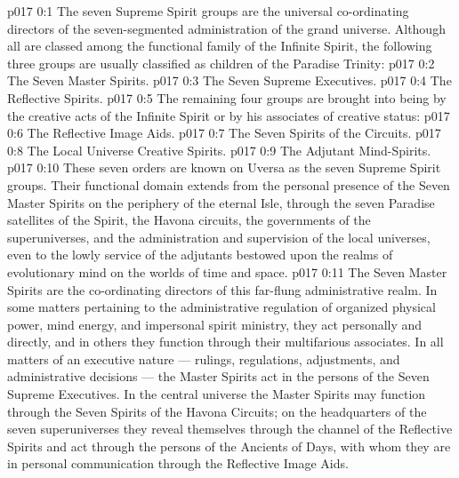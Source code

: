 \author{Divine Counsellor}
\vs p017 0:1 The seven Supreme Spirit groups are the universal co\hyp{}ordinating directors of the seven\hyp{}segmented administration of the grand universe. Although all are classed among the functional family of the Infinite Spirit, the following three groups are usually classified as children of the Paradise Trinity:
\vs p017 0:2 \bibnobreakspace The Seven Master Spirits.
\vs p017 0:3 \bibnobreakspace The Seven Supreme Executives.
\vs p017 0:4 \bibnobreakspace The Reflective Spirits.
\vs p017 0:5 \pc The remaining four groups are brought into being by the creative acts of the Infinite Spirit or by his associates of creative status:
\vs p017 0:6 \bibnobreakspace The Reflective Image Aids.
\vs p017 0:7 \bibnobreakspace The Seven Spirits of the Circuits.
\vs p017 0:8 \bibnobreakspace The Local Universe Creative Spirits.
\vs p017 0:9 \bibnobreakspace The Adjutant Mind\hyp{}Spirits.
\vs p017 0:10 \pc These seven orders are known on Uversa as the seven Supreme Spirit groups. Their functional domain extends from the personal presence of the Seven Master Spirits on the periphery of the eternal Isle, through the seven Paradise satellites of the Spirit, the Havona circuits, the governments of the superuniverses, and the administration and supervision of the local universes, even to the lowly service of the adjutants bestowed upon the realms of evolutionary mind on the worlds of time and space.
\vs p017 0:11 The Seven Master Spirits are the co\hyp{}ordinating directors of this far\hyp{}flung administrative realm. In some matters pertaining to the administrative regulation of organized physical power, mind energy, and impersonal spirit ministry, they act personally and directly, and in others they function through their multifarious associates. In all matters of an executive nature --- rulings, regulations, adjustments, and administrative decisions --- the Master Spirits act in the persons of the Seven Supreme Executives. In the central universe the Master Spirits may function through the Seven Spirits of the Havona Circuits; on the headquarters of the seven superuniverses they reveal themselves through the channel of the Reflective Spirits and act through the persons of the Ancients of Days, with whom they are in personal communication through the Reflective Image Aids.
